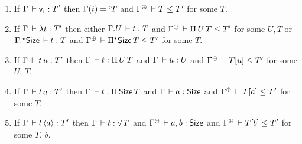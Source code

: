 \documentclass[acmlarge,review,anonymous]{acmart}\settopmatter{printfolios=true}
\newcommand{\LONGVERSION}[1]{}
\begin{document}
\LONGVERSION{
\begin{corollary}[Partial resurrection for substitution equality]
  If\/ $\sueq \Gamma \sigma {\sigma'} {\tau} \Delta$ then
  $\sueq {\resurrect \Gamma} \tau \tau \tau {\resurrect \Delta}$.
\end{corollary}
}

\begin{lemma}
\label{lem:invty} \bla
\begin{enumerate}
\LONGVERSION{
\item If\/ $\Gamma \der \Nat a : T'$ then $\Gamma \der a : \Size$ and $\resurrect\Gamma \der \Set[0] \leq T'$.
\item If\/ $\Gamma \der \Set[\ell] : T'$ then $\resurrect\Gamma \der \Set[\ell+1] \leq T'$.
\item If\/ $\Gamma \der \piT U T : T'$ then $\Gamma \der U : s$ and $\cext \Gamma U \der T : s$ and $\resurrect\Gamma \der s \leq T'$ for some $s$.
\item If\/ $\Gamma \der \epiT \Size T : T'$ then
  $\cext\Gamma \Size \der T : s$ and $\resurrect\Gamma \der s \leq T'$.
}
\item If\/ $\Gamma \der \ind i : T'$ then $\Gamma(i) = \erann[\noterased] T$ and $\resurrect\Gamma \der T \leq T'$ for some $T$.
\item If\/ $\Gamma \der \lambda t : T'$ then either
  $\cext \Gamma U \der t : T$
  and
  $\resurrect\Gamma \der \piT U T \leq T'$
  for some $U,T$ or
  $\eext \Gamma \Size \der t : T$
  and
  $\resurrect\Gamma \der \epiT\Size T \leq T'$
  for some $T$.
\item If\/ $\Gamma \der t\,u : T'$ then $\Gamma \der t : \piT U T$ and $\Gamma \der u : U$ and $\resurrect\Gamma \der T[u] \leq T'$ for some $U$, $T$.
\item If\/ $\Gamma \der t\,a : T'$ then $\Gamma \der t : \piT \Size T$ and $\Gamma \der a : \Size$ and $\resurrect\Gamma \der T[a] \leq T'$ for some $T$.
\item If\/ $\Gamma \der t\,\ann a : T'$ then
   $\Gamma \der t : \forallT T$ and
   $\resurrect\Gamma \der a,b : \Size$ and
   $\resurrect\Gamma \der T[b] \leq T'$ for some $T$, $b$.
\LONGVERSION{
\item If\/ $\Gamma \der \zero a : T'$ then $\resurrect \Gamma \der a,b : \Size$ and $\resurrect\Gamma \der \Nat (b + 1) \leq T'$ for some $b$.
\item If\/ $\Gamma \der \suc a t : T'$ then $\resurrect \Gamma \der a,b : \Size$ and $\Gamma \der t : \Nat b$ and $\resurrect\Gamma \der \Nat(b+1) \leq T'$.
}
\end{enumerate}
\end{lemma}
\end{document}
